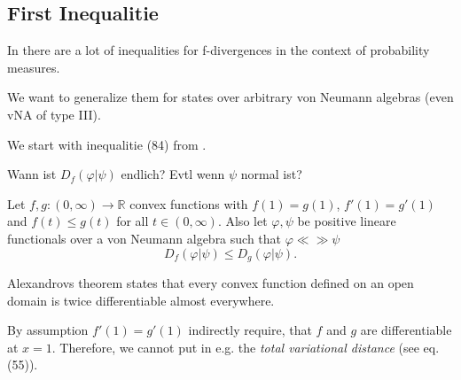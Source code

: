 \subsection{First Inequalitie}

In \cite{Sason_2016} there are a lot of inequalities for f-divergences in the
context of probability measures.

We want to generalize them for states over arbitrary von Neumann algebras
(even vNA of type III).




We start with inequalitie (84) from \cite{Sason_2016}.

\begin{question}
    Wann ist $D_f(\varphi|\psi)$ endlich?
    Evtl wenn $\psi$ normal ist?
\end{question}

\begin{proposition}
    Let $f,g: (0,\infty)\rightarrow\mathbb{R}$ convex functions
    with $f(1) = g(1)$, $f'(1) = g'(1)$
    and $f(t)\leq g(t)$ for all $t\in(0,\infty)$.
    Also let $\varphi, \psi$ be positive lineare functionals over a
    von Neumann algebra such that $\varphi\ll\gg\psi$
    \begin{equation}
        D_f(\varphi| \psi) \leq D_g(\varphi|\psi).
    \end{equation}
\end{proposition}

\begin{remark}
    Alexandrovs theorem states that every convex function defined on an
    open domain is twice differentiable almost everywhere.
\end{remark}

\begin{remark}
    By assumption $f'(1) = g'(1)$ indirectly require, that $f$ and $g$ are
    differentiable at $x=1$.
    Therefore, we cannot put in e.g. the \textit{total variational distance}
    (see \cite{Sason_2016} eq. (55)).
\end{remark}


